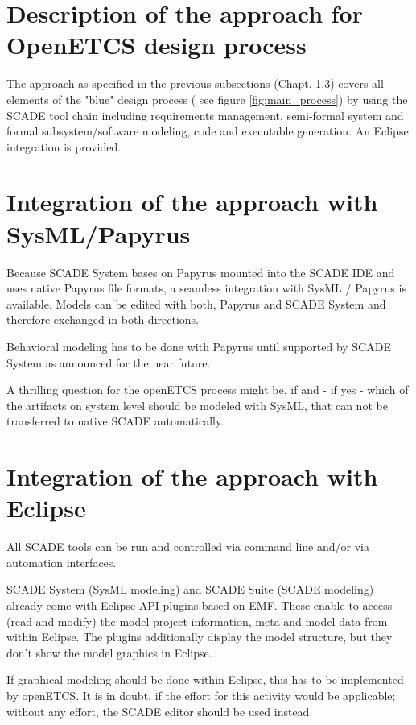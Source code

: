 \section{Description of the approach for OpenETCS design process}

The approach as specified in the previous subsections (Chapt.  1.3) covers all elements of the "blue" design process ( see figure \ref{fig:main_process}) 
by using the SCADE tool chain including requirements management, semi-formal system and formal subsystem/software modeling, code and executable generation. 
An Eclipse integration is provided. 

\section{Integration of the approach with SysML/Papyrus}

Because SCADE System bases on Papyrus mounted into the SCADE IDE and uses native Papyrus file formats, a seamless integration with SysML / Papyrus is available.
Models can be edited with both, Papyrus and SCADE System and therefore exchanged in both directions. 

Behavioral modeling has to be done with Papyrus until supported by SCADE System as announced for the near future. 

A thrilling question for the openETCS process might be, if and - if yes - which of the artifacts on system level should be modeled with SysML, that can not be transferred to native SCADE automatically. 


\section{Integration of the approach with Eclipse}

All SCADE tools can be run and controlled via command line and/or via automation interfaces. 

SCADE System (SysML modeling) and SCADE Suite (SCADE modeling) already come with Eclipse API plugins based on EMF. These enable to access (read and modify) the model project information, meta and model data from within Eclipse. 
The plugins additionally display the model structure, but they don't show the model graphics in Eclipse. 

If graphical modeling should be done within Eclipse, this has to be implemented by openETCS. It is in doubt, if the effort for this activity would be applicable; without any effort, the SCADE editor should be used instead. 
 

